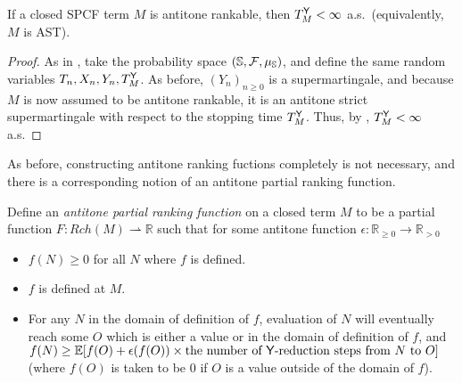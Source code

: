 
\begin{theorem} \label{thm:antitone rankable implies termination}
If a closed SPCF term $M$ is antitone rankable, then $T_M^{\mathsf{Y}} < \infty$ a.s.~(equivalently, $M$ is AST).
\end{theorem}
\begin{proof}
As in %
,
take the probability space $({\mathbb{S}}, \mathcal{F}, \mu_{\mathbb{S}})$, and define the same random variables $T_n, X_n, Y_n, T_M^{\mathsf{Y}}$. 
As before, $(Y_n)_{n \geq 0}$ is a supermartingale, and because $M$ is now assumed to be antitone rankable, it is an antitone strict supermartingale with respect to the stopping time $T_M^{\mathsf{Y}}$. Thus, by , $T_M^{\mathsf{Y}} < \infty$ a.s.
\end{proof}

As before, constructing antitone ranking fuctions completely is not necessary, and there is a corresponding notion of an antitone partial ranking function.

Define an \emph{antitone partial ranking function} on a closed term $M$ to be a partial function $F : Rch(M) \rightharpoonup \mathbb{R}$ such that for some antitone function $\epsilon : \mathbb{R}_{\geq 0} \to \mathbb{R}_{>0}$
\begin{itemize}
\item $f(N) \geq 0$ for all $N$ where $f$ is defined.
\item $f$ is defined at $M$.
\item For any $N$ in the domain of definition of $f$, evaluation of $N$ will eventually reach some $O$ which is either a value or in the domain of definition of $f$, and $f(N) \geq \mathbb E [f(O) + \epsilon(f(O)) \times \text{the number of $\mathsf{Y}$-reduction steps from $N$ to $O$}]$ (where $f(O)$ is taken to be 0 if $O$ is a value outside of the domain of $f$).
\end{itemize}

